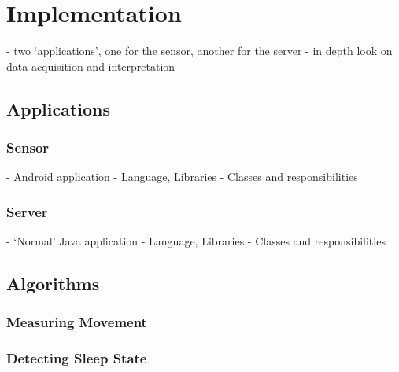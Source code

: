 \chapter{Implementation} %
\label{cha:implementation}
- two `applications', one for the sensor, another for the server
- in depth look on data acquisition and interpretation

\section{Applications} %
\label{sec:applications}

\subsection{Sensor} %
\label{sub:sensor}
- Android application
- Language, Libraries
- Classes and responsibilities

\subsection{Server} %
\label{sub:server}
- `Normal' Java application
- Language, Libraries
- Classes and responsibilities


\section{Algorithms} %
\label{sec:algorithms}

\subsection{Measuring Movement} %
\label{sub:measuring_movement}


\subsection{Detecting Sleep State} %
\label{sub:detecting_sleep_state}



